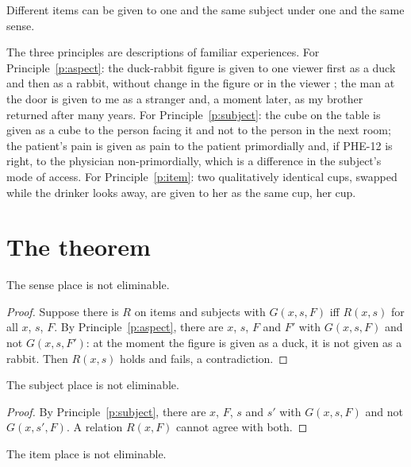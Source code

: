 \documentclass{situationist-preprint}
\begin{document}
\begin{principle}\label{p:item}
Different items can be given to one and the same subject under one and the same sense.
\end{principle}

The three principles are descriptions of familiar experiences. For Principle~\ref{p:aspect}: the duck-rabbit figure is given to one viewer first as a duck and then as a rabbit, without change in the figure or in the viewer \citep[Part II, §xi]{Wittgenstein1953}; the man at the door is given to me as a stranger and, a moment later, as my brother returned after many years. For Principle~\ref{p:subject}: the cube on the table is given as a cube to the person facing it and not to the person in the next room; the patient's pain is given as pain to the patient primordially and, if PHE-12 is right, to the physician non-primordially, which is a difference in the subject's mode of access. For Principle~\ref{p:item}: two qualitatively identical cups, swapped while the drinker looks away, are given to her as the same cup, her cup.

\section{The theorem}

\begin{lemma}\label{l:as}
The sense place is not eliminable.
\end{lemma}

\begin{proof}
Suppose there is $R$ on items and subjects with $G(x,s,F)$ iff $R(x,s)$ for all $x$, $s$, $F$. By Principle~\ref{p:aspect}, there are $x$, $s$, $F$ and $F'$ with $G(x,s,F)$ and not $G(x,s,F')$: at the moment the figure is given as a duck, it is not given as a rabbit. Then $R(x,s)$ holds and fails, a contradiction.
\end{proof}

\begin{lemma}\label{l:dative}
The subject place is not eliminable.
\end{lemma}

\begin{proof}
By Principle~\ref{p:subject}, there are $x$, $F$, $s$ and $s'$ with $G(x,s,F)$ and not $G(x,s',F)$. A relation $R(x,F)$ cannot agree with both.
\end{proof}

\begin{lemma}\label{l:item}
The item place is not eliminable.
\end{lemma}
\end{document}
